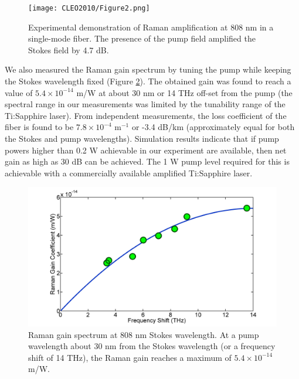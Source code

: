\begin{figure}[htb!]
\centering
\texttt{[image: CLEO2010/Figure2.png]}
\caption{Experimental demonstration of Raman amplification at 808 nm in a single-mode fiber. The presence of the pump field amplified the Stokes field by 4.7 dB.}
\label{fig:CLEO2010_Figure2}
\end{figure}

We also measured the Raman gain spectrum by tuning the pump while keeping the Stokes wavelength fixed (Figure \ref{fig:CLEO2010_Figure3}). The obtained gain was found to reach a value of $5.4 \times 10^{-14}$ m/W at about 30 nm or 14 THz off-set from the pump (the spectral range in our measurements was limited by the tunability range of the Ti:Sapphire laser). From independent measurements, the loss coefficient of the fiber is found to be $7.8 \times 10^{-4}$ m$^{-1}$ or -3.4 dB/km (approximately equal for both the Stokes and pump wavelengths). Simulation results indicate that if pump powers higher than 0.2 W achievable in our experiment are available, then net gain as high as 30 dB can be achieved. The 1 W pump level required for this is achievable with a commercially available amplified Ti:Sapphire laser. 

\begin{figure}[htb!]
\centering
\includegraphics[scale=0.11]{CLEO2010/Figure3.png}
\caption{Raman gain spectrum at 808 nm Stokes wavelength. At a pump wavelength about 30 nm from the Stokes wavelength (or a frequency shift of 14 THz), the Raman gain reaches a maximum of $5.4 \times 10^{-14}$ m/W.}
\label{fig:CLEO2010_Figure3}
\end{figure}
